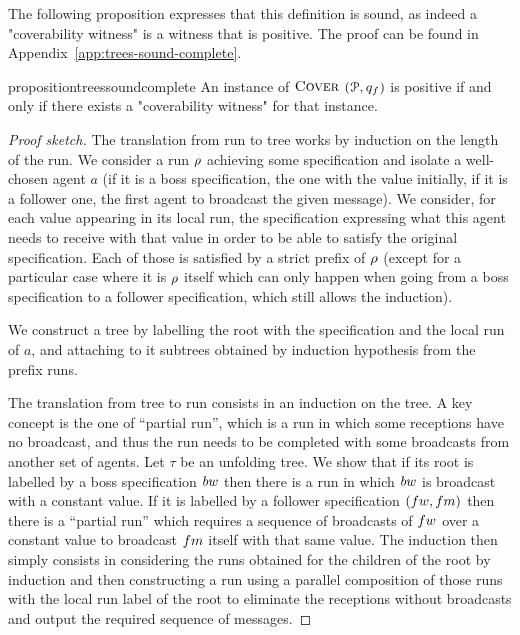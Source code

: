 The following proposition expresses that this definition is sound, as indeed a "coverability witness" is a witness that \COVER is positive.
The proof can be found in Appendix~\ref{app:trees-sound-complete}.


\begin{restatable}{proposition}{treessoundcomplete}
\label{prop:trees-sound-complete}
An instance of $\textsc{Cover}$ $(\mathcal{P},q_f)$ is positive if and only if there exists a "coverability witness" for that instance.
\end{restatable}

\begin{proof}[Proof sketch]
The translation from run to tree works by induction on the length of the run. We consider a run $\rho$ achieving some specification and isolate a well-chosen agent $a$ (if it is a boss specification, the one with the value initially, if it is a follower one, the first agent to broadcast the given message). We consider, for each value appearing in its local run, the specification expressing what this agent needs to receive with that value in order to be able to satisfy the original specification. 
Each of those is satisfied by a strict prefix of $\rho$ (except for a particular case where it is $\rho$ itself which can only happen when going from a boss specification to a follower specification, which still allows the induction).

We construct a tree by labelling the root with the specification and the local run of $a$, and attaching to it subtrees obtained by induction hypothesis from the prefix runs.

The translation from tree to run consists in an induction on the tree. A key concept is the one of ``partial run'', which is a run in which some receptions have no broadcast, and thus the run needs to be completed with some broadcasts from another set of agents.
 Let $\tau$ be an unfolding tree. We show that if its root is labelled by a boss specification $\bossspec$ then there is a run in which $\bossspec$ is broadcast with a constant value. If it is labelled by a follower specification $(\followwordspec, \followmessagespec)$ then there is a ``partial run'' which requires a sequence of broadcasts of $\followwordspec$ over a constant value to broadcast $\followmessagespec$ itself with that same value.
 The induction then simply consists in considering the runs obtained for the children of the root by induction and then constructing a run using a parallel composition of those runs with the local run label of the root to eliminate the receptions without broadcasts and output the required sequence of messages. 
\end{proof}



